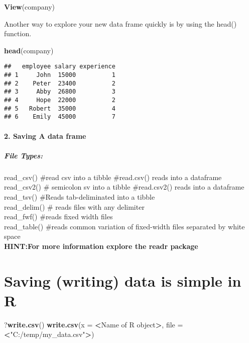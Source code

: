\documentclass[]{article}
\newenvironment{Shaded}{\begin{snugshade}}{\end{snugshade}}
\newcommand{\KeywordTok}[1]{\textcolor[rgb]{0.13,0.29,0.53}{\textbf{#1}}}
\newcommand{\DataTypeTok}[1]{\textcolor[rgb]{0.13,0.29,0.53}{#1}}
\newcommand{\StringTok}[1]{\textcolor[rgb]{0.31,0.60,0.02}{#1}}
\newcommand{\OperatorTok}[1]{\textcolor[rgb]{0.81,0.36,0.00}{\textbf{#1}}}
\newcommand{\NormalTok}[1]{#1}
\let\oldparagraph\paragraph
\renewcommand{\paragraph}[1]{\oldparagraph{#1}\mbox{}}
\let\oldsubparagraph\subparagraph
\renewcommand{\subparagraph}[1]{\oldsubparagraph{#1}\mbox{}}
\begin{document}
\begin{Shaded}
\begin{Highlighting}[]
\KeywordTok{View}\NormalTok{(company)}
\end{Highlighting}
\end{Shaded}

Another way to explore your new data frame quickly is by using the
head() function.

\begin{Shaded}
\begin{Highlighting}[]
\KeywordTok{head}\NormalTok{(company)}
\end{Highlighting}
\end{Shaded}

\begin{verbatim}
##   employee salary experience
## 1     John  15000          1
## 2    Peter  23400          2
## 3     Abby  26800          3
## 4     Hope  22000          2
## 5   Robert  35000          4
## 6    Emily  45000          7
\end{verbatim}

\paragraph{2. Saving A data frame}\label{saving-a-data-frame}

\subparagraph{File Types:}\label{file-types}

read\_csv() \#read csv into a tibble \#read.csv() reads into a
dataframe\\
read\_csv2() \# semicolon sv into a tibble \#read.csv2() reads into a
dataframe\\
read\_tsv() \#Reads tab-deliminated into a tibble\\
read\_delim() \# reads files with any delimiter\\
read\_fwf() \#reads fixed width files\\
read\_table() \#reads common variation of fixed-width files separated by
white space\\
\textbf{HINT:For more information explore the readr package }

\section{Saving (writing) data is simple in
R}\label{saving-writing-data-is-simple-in-r}

\begin{Shaded}
\begin{Highlighting}[]
\NormalTok{?}\KeywordTok{write.csv}\NormalTok{()}
\KeywordTok{write.csv}\NormalTok{(}\DataTypeTok{x =} \OperatorTok{<}\NormalTok{Name of R object}\OperatorTok{>}\NormalTok{, }\DataTypeTok{file  =} \OperatorTok{<}\StringTok{"C:/temp/my_data.csv"}\OperatorTok{>}\NormalTok{)}
\end{Highlighting}
\end{Shaded}
\end{document}
